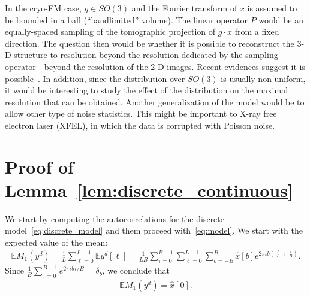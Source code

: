 \documentclass[english,12pt]{article}
\newcommand{\I}{\iota}
\newcommand{\tB}{B}
\newcommand{\hx}{\hat{x}}
\newcommand{\E}{\mathbb{E}}
\newcommand{\TODO}[1]{{\color{red}{[#1]}}}
\numberwithin{equation}{section}
\numberwithin{thm}{section} %
\begin{document}
In the cryo-EM case, $g\in SO(3)$ and the Fourier transform of $x$ is assumed to be bounded in a ball (``bandlimited'' volume). The linear operator $P$ would be an equally-spaced sampling of the tomographic projection of $g\cdot x$ from a fixed direction. The question then would be whether it is possible to reconstruct the 3-D structure to resolution beyond the resolution dedicated by the sampling operator---beyond the resolution of the 2-D images. Recent evidences suggest it is possible~\cite{chen2018single}. In addition, since the distribution over $SO(3)$ is usually non-uniform, it would be interesting to study the effect of the distribution on the maximal resolution that can be obtained. Another generalization of the model would be to allow other type of noise statistics. This might be important to X-ray free electron laser (XFEL), in which the data is corrupted with Poisson noise.
 
 \TODO{Relation to 2-D Kam's method?}
	




\appendix

\section{Proof of Lemma~\ref{lem:discrete_continuous}}  
\label{sec:proof_lem:discrete_continuous}
We start by computing the autocorrelations for the discrete model~\eqref{eq:discrete_model} and them proceed with~\eqref{eq:model}.
We start with the expected value of the mean:
\begin{equation}
\begin{split}
\E M_1(y^d) =  \frac{1}{L} \sum_{\ell=0}^{L-1}\E y^d[\ell] =  \frac{1}{LB}\sum_{\tau=0}^{B-1}\sum_{\ell=0}^{L-1}
\sum_{b=-\tB}^{\tB}\hat{x}[b]e^{2\pi\I b \left(\frac{\ell}{L} + \frac{\tau}{B}\right) }.
\end{split}
\end{equation}
Since $\frac{1}{B}\sum_{\tau=0}^{B-1}e^{2\pi\I b \tau/B}=\delta_b$, we conclude that 
\begin{equation} \label{eq:mean}
\begin{split}
\E M_1(y^d) = \hx[0].
\end{split}
\end{equation}
\end{document}
